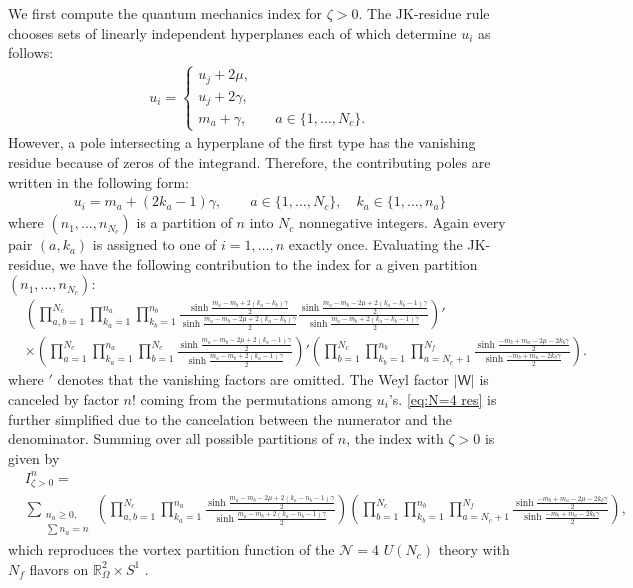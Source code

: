 \documentclass[a4paper,11pt]{article}
\begin{document}
We first compute the quantum mechanics index for $\zeta > 0$. The JK-residue rule chooses sets of linearly independent hyperplanes each of which determine $u_i$ as follows:
\begin{align}
u_i = \left\{\begin{array}{l}
u_j+2 \mu, \\
u_j+2 \gamma, \\
m_a+\gamma, \qquad a \in \{1,\ldots,N_c\}.
\end{array}\right.
\end{align}
However, a pole intersecting a hyperplane of the first type has the vanishing residue because of zeros of the integrand. Therefore, the contributing poles are written in the following form:
\begin{align}
u_i = m_a+(2 k_a-1) \gamma,\qquad
a \in \{1,\ldots,N_c\}, \quad
k_a \in \{1,\ldots,n_a\}
\end{align}
where $(n_1,\ldots,n_{N_c})$ is a partition of $n$ into $N_c$ nonnegative integers. Again every pair $(a,k_a)$ is assigned to one of $i = 1,\ldots,n$ exactly once. Evaluating the JK-residue, we have the following contribution to the index for a given partition $(n_1,\ldots,n_{N_c})$:
\begin{align}
\label{eq:N=4 res}
%
& \left(\prod_{a,b = 1}^{N_c} \prod_{k_a = 1}^{n_a} \prod_{k_b = 1}^{n_b} \frac{\sinh \frac{m_a-m_b+2 (k_a-k_b) \gamma}{2}}{\sinh \frac{m_a-m_b-2 \mu+2 (k_a-k_b) \gamma}{2}} \frac{\sinh \frac{m_a-m_b-2 \mu+2 (k_a-k_b-1) \gamma}{2}}{\sinh \frac{m_a-m_b+2 (k_a-k_b-1) \gamma}{2}}\right)' \nonumber \\
%
& \times \left(\prod_{a = 1}^{N_c} \prod_{k_a = 1}^{n_a} \prod_{b = 1}^{N_c} \frac{\sinh \frac{m_a-m_b-2 \mu+2 (k_a-1) \gamma}{2}}{\sinh \frac{m_a-m_b+2 (k_a-1) \gamma}{2}}\right)' \left(\prod_{b = 1}^{N_c} \prod_{k_b = 1}^{n_b} \prod_{a = N_c+1}^{N_f} \frac{\sinh \frac{-m_b+m_a-2 \mu-2 k_b \gamma}{2}}{\sinh \frac{-m_b+m_a-2 k_b \gamma}{2}}\right).
%
\end{align}
where $'$ denotes that the vanishing factors are omitted. The Weyl factor $|\mathsf W|$ is canceled by factor $n!$ coming from the permutations among $u_i$'s. \eqref{eq:N=4 res} is further simplified due to the cancelation between the numerator and the denominator. Summing over all possible partitions of $n$, the index with $\zeta > 0$ is given by
\begin{align}
\label{eq:ind+}
& I^n_{\zeta > 0} = \nonumber \\
& \sum_{\substack{n_a \geq 0, \\
\sum n_a = n}} \left(\prod_{a,b = 1}^{N_c} \prod_{k_a = 1}^{n_a} \frac{\sinh \frac{m_a-m_b-2 \mu+2 (k_a-n_b-1) \gamma}{2}}{\sinh \frac{m_a-m_b+2 (k_a-n_b-1) \gamma}{2}}\right) \left(\prod_{b = 1}^{N_c} \prod_{k_b = 1}^{n_b} \prod_{a = N_c+1}^{N_f} \frac{\sinh \frac{-m_b+m_a-2 \mu-2 k_b \gamma}{2}}{\sinh \frac{-m_b+m_a-2 k_b \gamma}{2}}\right),
\end{align}
which reproduces the vortex partition function of the $\mathcal N = 4$ $U(N_c)$ theory with $N_f$ flavors on $\mathbb R_\Omega^2 \times S^1$ \cite{Kim:2012uz}.
\end{document}
